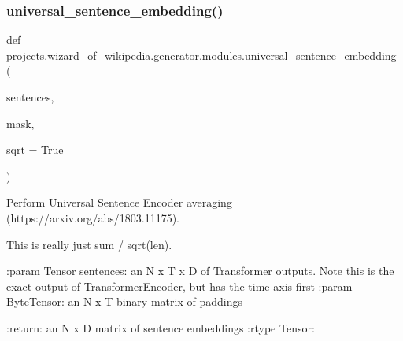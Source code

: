 \subsubsection{\texorpdfstring{universal\+\_\+sentence\+\_\+embedding()}{universal\_sentence\_embedding()}}
{\footnotesize\ttfamily def projects.\+wizard\+\_\+of\+\_\+wikipedia.\+generator.\+modules.\+universal\+\_\+sentence\+\_\+embedding (\begin{DoxyParamCaption}\item[{}]{sentences,  }\item[{}]{mask,  }\item[{}]{sqrt = {\ttfamily True} }\end{DoxyParamCaption})}

\begin{DoxyVerb}Perform Universal Sentence Encoder averaging (https://arxiv.org/abs/1803.11175).

This is really just sum / sqrt(len).

:param Tensor sentences: an N x T x D of Transformer outputs. Note this is
    the exact output of TransformerEncoder, but has the time axis first
:param ByteTensor: an N x T binary matrix of paddings

:return: an N x D matrix of sentence embeddings
:rtype Tensor:
\end{DoxyVerb}
 